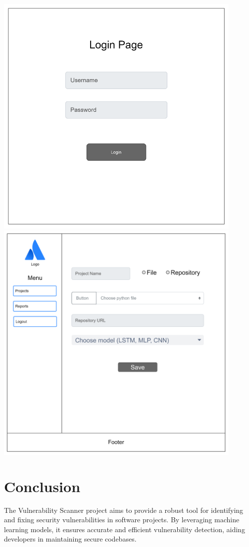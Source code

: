 \includegraphics[width=0.9\textwidth]{pictures/loginPAge.png}
\newline
\includegraphics[width=0.9\textwidth]{pictures/menu.png}

\section*{Conclusion}
The Vulnerability Scanner project aims to provide a robust tool for identifying and fixing security vulnerabilities in software projects. By leveraging machine learning models, it ensures accurate and efficient vulnerability detection, aiding developers in maintaining secure codebases.

